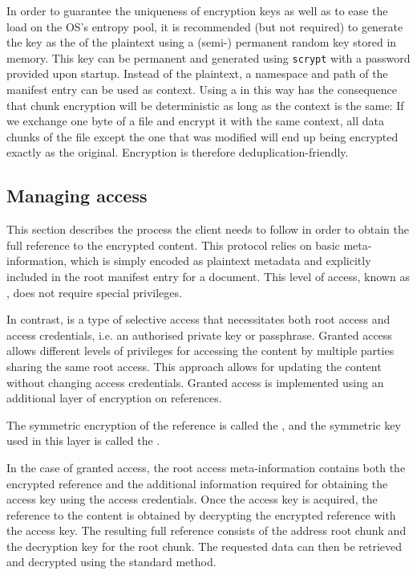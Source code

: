 In order to guarantee the uniqueness of encryption keys as well as to ease the load on the OS's entropy pool, it is recommended (but not required) to generate the key as the  of the plaintext using a (semi-) permanent random key stored in memory. 
This key can be permanent and generated using \lstinline{scrypt} \citep{percival2009stronger}
with a password provided upon startup. Instead of the plaintext, a namespace and path of the manifest entry can be used as context.
Using a  in this way has the consequence that chunk encryption will be deterministic as long as the context is the same: If we exchange one byte of a file and encrypt it with the same context, all data chunks of the file except the one that was modified will end up being encrypted exactly as the original. Encryption is therefore deduplication-friendly. 


\subsection{Managing access\statusgreen}\label{sec:managing-access}

This section describes the process the client needs to follow in order to obtain the full reference to the encrypted content. This protocol relies on basic meta-information, which is simply encoded as plaintext metadata and explicitly included in the root manifest entry for a document. This level of access, known as , does not require special privileges.

In contrast,  is a type of selective access that necessitates both root access and access credentials, i.e. an authorised private key or passphrase. Granted access allows different levels of privileges for accessing the content by multiple parties sharing the same root access. This approach allows for updating the content without changing access credentials. Granted access is implemented using an additional layer of encryption on references.

The symmetric encryption of the reference is called the , and the symmetric key used in this layer is called the .

In the case of granted access, the root access meta-information contains both the encrypted reference and the additional information required for obtaining the access key using the access credentials. Once the access key is acquired, the reference to the content is obtained by decrypting the encrypted reference with the access key. The resulting full reference consists of the address root chunk and the decryption key for the root chunk. The requested data can then be retrieved and decrypted using the standard method.

